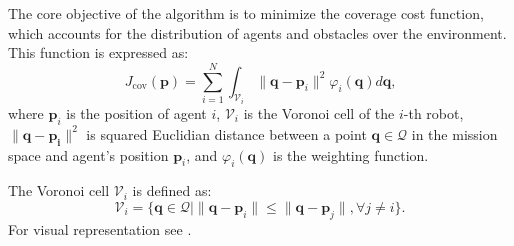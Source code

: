        The core objective of the algorithm is to minimize the coverage cost function, which accounts for the distribution of agents and obstacles over the environment. 
        This function is expressed as:
        \begin{equation}
            J_{\text{cov}}(\mathbf{p}) = \sum_{i=1}^{N} \int_{\mathcal{V}_i} \lVert\mathbf{q}-\mathbf{p}_i\rVert^2 \varphi_i (\mathbf{q})d\mathbf{q}\text{,}
            \label{coverage_cost_function}
        \end{equation}
        where $\mathbf{p}_i$ is the position of agent $i$, $\mathcal{V}_i$ is the Voronoi cell of the $i$-th robot, $\lVert\mathbf{q}-\mathbf{p_i}\rVert^2$ is squared Euclidian distance between a point $\mathbf{q} \in \mathcal{Q}$ in the mission space and agent's position $\mathbf{p}_i$, 
        and $\varphi_i (\mathbf{q})$ is the weighting function.

        The Voronoi cell $\mathcal{V}_i$ is defined as: 
        \begin{equation}
            \mathcal{V}_i = \{\mathbf{q} \in \mathcal{Q} \lvert \lVert \mathbf{q} - \mathbf{p}_i \rVert \leq \lVert \mathbf{q} - \mathbf{p}_j \rVert, \forall j \neq i\}\text{.}
        \end{equation}
        For visual representation see . 

